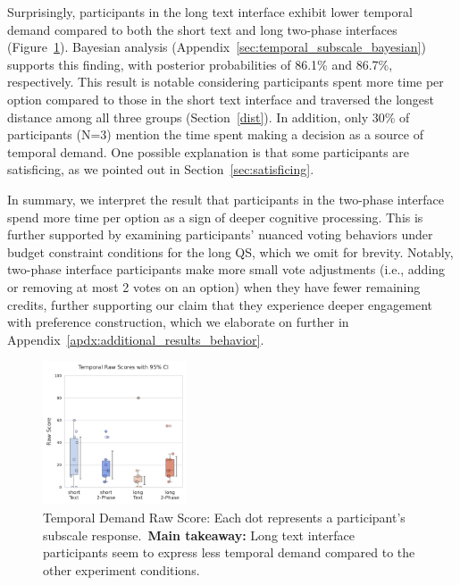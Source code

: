 Surprisingly, participants in the long text interface exhibit lower temporal demand compared to both the short text and long two-phase interfaces (Figure~\ref{fig:temporal_cog_score}). Bayesian analysis (Appendix~\ref{sec:temporal_subscale_bayesian}) supports this finding, with posterior probabilities of 86.1\% and 86.7\%, respectively. This result is notable considering participants spent more time per option compared to those in the short text interface and traversed the longest distance among all three groups (Section~\ref{dist}). In addition, only 30\% of participants (N=3) mention the time spent making a decision as a source of temporal demand. One possible explanation is that some participants are satisficing, as we pointed out in Section~\ref{sec:satisficing}.  

In summary, we interpret the result that participants in the two-phase interface spend more time per option as a sign of deeper cognitive processing. This is further supported by examining participants' nuanced voting behaviors under budget constraint conditions for the long QS, which we omit for brevity. Notably, two-phase interface participants make more small vote adjustments (i.e., adding or removing at most 2 votes on an option) when they have fewer remaining credits, further supporting our claim that they experience deeper engagement with preference construction, which we elaborate on further in Appendix~\ref{apdx:additional_results_behavior}.

\begin{figure}[h]
    \centering
    \includegraphics[width=0.38\textwidth, trim=0 13 0 13, clip]{content/image/cog/Temporal_scores.pdf}
    \caption{Temporal Demand Raw Score: Each dot represents a participant's subscale response.~\textbf{Main takeaway:} Long text interface participants seem to express less temporal demand compared to the other experiment conditions.}
    \vspace{-12pt}
    \label{fig:temporal_cog_score}
\end{figure}
